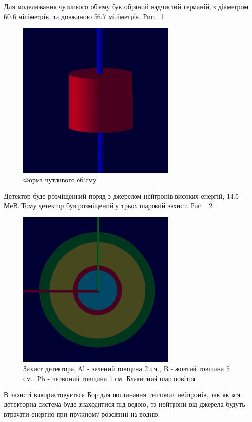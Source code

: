 \documentclass[a4paper, 14pt]{article}
\numberwithin{equation}{section}
\numberwithin{table}{section}
\begin{document}
	Для моделювання чутливого об'єму був обраний надчистий германій, з діаметром 60.6 міліметрів, та довжиною 56.7 міліметрів. Рис. ~\ref{ris:s_detector_volume} 	
	\begin{figure}[hbt!]
		\centering \includegraphics[width=0.7\textwidth]{images/sDetector158cm3.png}
		\caption{Форма чутливого об'єму} 
		\label{ris:s_detector_volume}	
	\end{figure}
	Детектор буде розміщенний поряд з джерелом нейтронів високих енергій, 14.5 МеВ. Тому детектор був розміщений у трьох шаровий захист. Рис. ~\ref{ris:s_detector_P}	
	\begin{figure}[hbt!]
		\centering \includegraphics[width=0.7\textwidth]{images/dectorPrt.png}
		\caption{Захист детектора, Al - зелений товщина 2 см., B - жовтий товщина 5 см., Pb - червоний товщина 1 см. Блакитний шар повітря} 
		\label{ris:s_detector_P}	
	\end{figure} 
	В захисті використовується Бор для поглинання теплових нейтронів, так як вся детекторна система буде знаходитися під водою, то нейтрони від джерела будуть втрачати енергію при пружному розсіянні на водню. 
	
\end{document}
